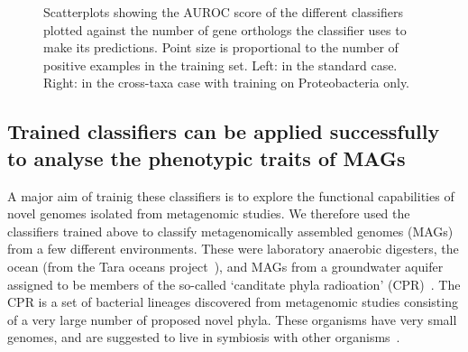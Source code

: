 \documentclass[10pt,letterpaper]{article}
\begin{document}
\begin{figure}
 \caption{Scatterplots showing the AUROC score of the different classifiers plotted against the number of gene orthologs the classifier uses to make its predictions. Point size is proportional to the number of positive examples in the training set. Left: in the standard case. Right: in the cross-taxa case with training on Proteobacteria only.}\label{fig3}
\end{figure}


\subsection*{Trained classifiers can be applied successfully to analyse the phenotypic traits of MAGs}
A major aim of trainig these classifiers is to explore the functional capabilities of novel genomes isolated from metagenomic studies. We therefore used the classifiers trained above to classify metagenomically assembled genomes (MAGs) from a few different environments. These were laboratory anaerobic digesters, the ocean (from the Tara oceans project~\cite{Zhang2015}), and MAGs from a groundwater aquifer assigned to be members of the so-called `canditate phyla radioation' (CPR)~\cite{Anantharaman2016}. The CPR is a set of bacterial lineages discovered from metagenomic studies consisting of a very large number of proposed novel phyla. These organisms have very small genomes, and are suggested to live in symbiosis with other organisms~\cite{Danczak2017}.
\end{document}
